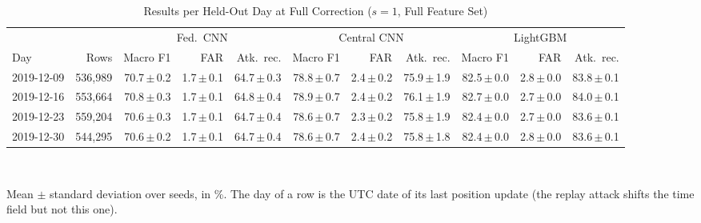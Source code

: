 \begin{table}[t]
\centering
\scriptsize
\caption{Results per Held-Out Day at Full Correction ($s=1$, Full Feature Set)}
\label{tab:perday}
\setlength{\tabcolsep}{2pt}
\begin{tabular}{lrrrrrrrrrr}
\toprule
& & \multicolumn{3}{c}{Fed.\ CNN} & \multicolumn{3}{c}{Central CNN} & \multicolumn{3}{c}{LightGBM} \\
\cmidrule(lr){3-5}\cmidrule(lr){6-8}\cmidrule(lr){9-11}
Day & Rows & Macro F1 & FAR & Atk.\ rec. & Macro F1 & FAR & Atk.\ rec. & Macro F1 & FAR & Atk.\ rec. \\
\midrule
2019-12-09 & 536{,}989 & 70.7{\,}$\pm${\,}0.2 & 1.7{\,}$\pm${\,}0.1 & 64.7{\,}$\pm${\,}0.3 & 78.8{\,}$\pm${\,}0.7 & 2.4{\,}$\pm${\,}0.2 & 75.9{\,}$\pm${\,}1.9 & 82.5{\,}$\pm${\,}0.0 & 2.8{\,}$\pm${\,}0.0 & 83.8{\,}$\pm${\,}0.1 \\
2019-12-16 & 553{,}664 & 70.8{\,}$\pm${\,}0.3 & 1.7{\,}$\pm${\,}0.1 & 64.8{\,}$\pm${\,}0.4 & 78.9{\,}$\pm${\,}0.7 & 2.4{\,}$\pm${\,}0.2 & 76.1{\,}$\pm${\,}1.9 & 82.7{\,}$\pm${\,}0.0 & 2.7{\,}$\pm${\,}0.0 & 84.0{\,}$\pm${\,}0.1 \\
2019-12-23 & 559{,}204 & 70.6{\,}$\pm${\,}0.3 & 1.7{\,}$\pm${\,}0.1 & 64.7{\,}$\pm${\,}0.4 & 78.6{\,}$\pm${\,}0.7 & 2.3{\,}$\pm${\,}0.2 & 75.8{\,}$\pm${\,}1.9 & 82.4{\,}$\pm${\,}0.0 & 2.7{\,}$\pm${\,}0.0 & 83.6{\,}$\pm${\,}0.1 \\
2019-12-30 & 544{,}295 & 70.6{\,}$\pm${\,}0.2 & 1.7{\,}$\pm${\,}0.1 & 64.7{\,}$\pm${\,}0.4 & 78.6{\,}$\pm${\,}0.7 & 2.4{\,}$\pm${\,}0.2 & 75.8{\,}$\pm${\,}1.8 & 82.4{\,}$\pm${\,}0.0 & 2.8{\,}$\pm${\,}0.0 & 83.6{\,}$\pm${\,}0.1 \\
\bottomrule
\end{tabular}
\\[2pt]
\parbox{\linewidth}{\scriptsize Mean $\pm$ standard deviation over  seeds, in \%. The day of a row is the UTC date of its last position update (the replay attack shifts the time field but not this one).}
\end{table}
